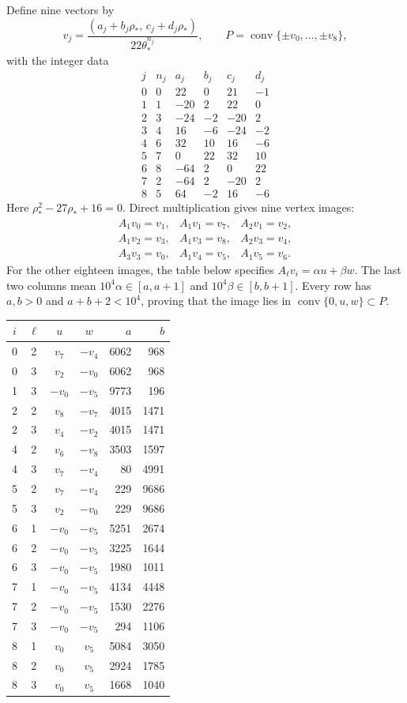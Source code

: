 \documentclass[11pt,a4paper]{article}
\numberwithin{equation}{section}
\begin{document}
Define nine vectors by
\[
 v_j=\frac{(a_j+b_j\rho_*,\,c_j+d_j\rho_*)}
              {22\theta_*^{n_j}},
 \qquad P=\operatorname{conv}\{\pm v_0,\ldots,\pm v_8\},
\]
with the integer data
\[
\begin{array}{c|rrrrr}
 j&n_j&a_j&b_j&c_j&d_j\\\hline
 0&0&22&0&21&-1\\
 1&1&-20&2&22&0\\
 2&3&-24&-2&-20&2\\
 3&4&16&-6&-24&-2\\
 4&6&32&10&16&-6\\
 5&7&0&22&32&10\\
 6&8&-64&2&0&22\\
 7&2&-64&2&-20&2\\
 8&5&64&-2&16&-6
\end{array}
\]
Here \(\rho_*^2-27\rho_*+16=0\). Direct multiplication gives nine vertex images:
\[
\begin{array}{lll}
 A_1v_0=v_1,&A_1v_1=v_7,&A_2v_1=v_2,\\
 A_1v_2=v_3,&A_1v_3=v_8,&A_2v_3=v_4,\\
 A_3v_3=v_0,&A_1v_4=v_5,&A_1v_5=v_6.
\end{array}
\]
For the other eighteen images, the table below specifies
\(A_\ell v_i=\alpha u+\beta w\).
The last two columns mean
\(10^4\alpha\in[a,a+1]\) and \(10^4\beta\in[b,b+1]\).
Every row has \(a,b>0\) and \(a+b+2<10^4\), proving that the image lies in
\(\operatorname{conv}\{0,u,w\}\subset P\).
\begin{center}
\small
\begin{tabular}{ccccrr}
\toprule
\(i\)&\(\ell\)&\(u\)&\(w\)&\(a\)&\(b\)\\
\midrule
0&2&\(v_7\)&\(-v_4\)&6062&968\\
0&3&\(v_2\)&\(-v_0\)&6062&968\\
1&3&\(-v_0\)&\(-v_5\)&9773&196\\
2&2&\(v_8\)&\(-v_7\)&4015&1471\\
2&3&\(v_4\)&\(-v_2\)&4015&1471\\
4&2&\(v_6\)&\(-v_8\)&3503&1597\\
4&3&\(v_7\)&\(-v_4\)&80&4991\\
5&2&\(v_7\)&\(-v_4\)&229&9686\\
5&3&\(v_2\)&\(-v_0\)&229&9686\\
6&1&\(-v_0\)&\(-v_5\)&5251&2674\\
6&2&\(-v_0\)&\(-v_5\)&3225&1644\\
6&3&\(-v_0\)&\(-v_5\)&1980&1011\\
7&1&\(-v_0\)&\(-v_5\)&4134&4448\\
7&2&\(-v_0\)&\(-v_5\)&1530&2276\\
7&3&\(-v_0\)&\(-v_5\)&294&1106\\
8&1&\(v_0\)&\(v_5\)&5084&3050\\
8&2&\(v_0\)&\(v_5\)&2924&1785\\
8&3&\(v_0\)&\(v_5\)&1668&1040\\
\bottomrule
\end{tabular}
\end{center}
\end{document}
